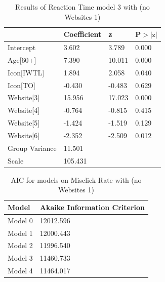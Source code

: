 \documentclass[12pt,twoside]{reedthesis}
\begin{document}
\begin{table}[h!]
        \centering
        \begin{tabular}{| p{5cm} | p{2.5cm} | p{2.5cm} | p{2.5cm} |}
            \hline
            & Coefficient & z & P$>|\text{z}|$\\
            \hline
            Intercept & 3.602 & 3.789 & 0.000\\
            \hline
            Age[60+] & 7.390 & 10.011 & 0.000\\
            \hline
            Icon[IWTL] & 1.894 & 2.058 & 0.040\\
            \hline
            Icon[TO] & -0.430 & -0.483 & 0.629\\
            \hline
            Website[3] & 15.956 & 17.023 & 0.000\\
            \hline
            Website[4] & -0.764 & -0.815 & 0.415\\
            \hline
            Website[5] & -1.424 & -1.519 & 0.129\\
            \hline
            Website[6] & -2.352 & -2.509 & 0.012\\
            \hline
            Group Variance & 11.501 &&\\
            \hline
            Scale & 105.431 &&\\
            \hline
        \end{tabular}
        \caption{Results of Reaction Time model 3 with (no Websites 1)}
    \end{table}     

\begin{table}[h!]
        \centering
        \begin{tabular}{| p{3.5cm} | p{7.5cm} |}
            \hline
            Model & Akaike Information Criterion\\
            \hline
            Model 0 & 12012.596\\
            \hline
            Model 1 & 12000.443\\
            \hline
            Model 2 & 11996.540\\
            \hline
            Model 3 & 11460.733\\
            \hline
            Model 4 & 11464.017\\
            \hline
        \end{tabular}
        \caption{AIC for models on Misclick Rate with (no Websites 1)}
    \end{table}
\end{document}
